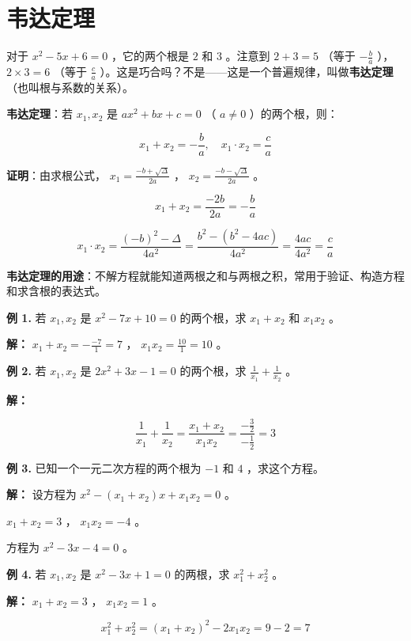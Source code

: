 \section*{韦达定理}


\begin{explore}


对于 $x^2 - 5x + 6 = 0$ ，它的两个根是 $2$ 和 $3$ 。注意到 $2 + 3 = 5$ （等于 $-\frac{b}{a}$ ）， $2 \times 3 = 6$ （等于 $\frac{c}{a}$ ）。这是巧合吗？不是——这是一个普遍规律，叫做\textbf{韦达定理}（也叫根与系数的关系）。

\end{explore}

\begin{understand}


\textbf{韦达定理}：若 $x_1, x_2$ 是 $ax^2 + bx + c = 0$ （ $a \neq 0$ ）的两个根，则：

\[
x_1 + x_2 = -\frac{b}{a}, \quad x_1 \cdot x_2 = \frac{c}{a}
\]


\textbf{证明}：由求根公式， $x_1 = \frac{-b + \sqrt{\Delta}}{2a}$ ， $x_2 = \frac{-b - \sqrt{\Delta}}{2a}$ 。

\[
x_1 + x_2 = \frac{-2b}{2a} = -\frac{b}{a}
\]


\[
x_1 \cdot x_2 = \frac{(-b)^2 - \Delta}{4a^2} = \frac{b^2 - (b^2 - 4ac)}{4a^2} = \frac{4ac}{4a^2} = \frac{c}{a}
\]


\textbf{韦达定理的用途}：不解方程就能知道两根之和与两根之积，常用于验证、构造方程和求含根的表达式。

\end{understand}

\begin{workedexamples}


\textbf{例 1.} 若 $x_1, x_2$ 是 $x^2 - 7x + 10 = 0$ 的两个根，求 $x_1 + x_2$ 和 $x_1 x_2$ 。

\textbf{解：} $x_1 + x_2 = -\frac{-7}{1} = 7$ ， $x_1 x_2 = \frac{10}{1} = 10$ 。

\textbf{例 2.} 若 $x_1, x_2$ 是 $2x^2 + 3x - 1 = 0$ 的两个根，求 $\frac{1}{x_1} + \frac{1}{x_2}$ 。

\textbf{解：}

\[
\frac{1}{x_1} + \frac{1}{x_2} = \frac{x_1 + x_2}{x_1 x_2} = \frac{-\frac{3}{2}}{-\frac{1}{2}} = 3
\]


\textbf{例 3.} 已知一个一元二次方程的两个根为 $-1$ 和 $4$ ，求这个方程。

\textbf{解：} 设方程为 $x^2 - (x_1 + x_2)x + x_1 x_2 = 0$ 。

$x_1 + x_2 = 3$ ， $x_1 x_2 = -4$ 。

方程为 $x^2 - 3x - 4 = 0$ 。

\textbf{例 4.} 若 $x_1, x_2$ 是 $x^2 - 3x + 1 = 0$ 的两根，求 $x_1^2 + x_2^2$ 。

\textbf{解：} $x_1 + x_2 = 3$ ， $x_1 x_2 = 1$ 。

\[
x_1^2 + x_2^2 = (x_1 + x_2)^2 - 2x_1 x_2 = 9 - 2 = 7
\]


\end{workedexamples}

